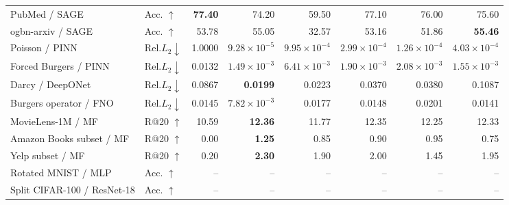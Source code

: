 \begin{table}[htbp]
{\begin{tabular}{llrrrrrr}
PubMed / SAGE  &  Acc. $\uparrow$  &  \textbf{77.40}  &  74.20  &  59.50  &  77.10  &  \cellcolor{oursbg}76.00 &  75.60 \\
ogbn-arxiv / SAGE  &  Acc. $\uparrow$  &  53.78  &  55.05  &  32.57  &  53.16  &  \cellcolor{oursbg}51.86 &  \textbf{55.46} \\
Poisson / PINN  &  Rel.$L_2\downarrow$  &  1.0000  &  {\boldmath $9.28\!\times\!10^{-5}$}  &  $9.95\!\times\!10^{-4}$  &  $2.99\!\times\!10^{-4}$  &  \cellcolor{oursbg}$1.26\!\times\!10^{-4}$ &  $4.03\!\times\!10^{-4}$ \\
Forced Burgers / PINN  &  Rel.$L_2\downarrow$  &  0.0132  &  {\boldmath $1.49\!\times\!10^{-3}$}  &  $6.41\!\times\!10^{-3}$  &  $1.90\!\times\!10^{-3}$  &  \cellcolor{oursbg}$2.08\!\times\!10^{-3}$ &  $1.55\!\times\!10^{-3}$ \\
Darcy / DeepONet  &  Rel.$L_2\downarrow$  &  0.0867  &  \textbf{0.0199}  &  0.0223  &  0.0370  &  \cellcolor{oursbg}0.0380 &  0.1087 \\
Burgers operator / FNO  &  Rel.$L_2\downarrow$  &  0.0145  &  {\boldmath $7.82\!\times\!10^{-3}$}  &  0.0177  &  0.0148  &  \cellcolor{oursbg}0.0201 &  0.0141 \\
MovieLens-1M / MF  &  R@20 $\uparrow$  &  10.59  &  \textbf{12.36}  &  11.77  &  12.35  &  \cellcolor{oursbg}12.25 &  12.33 \\
Amazon Books subset / MF  &  R@20 $\uparrow$  &  0.00  &  \textbf{1.25}  &  0.85  &  0.90  &  \cellcolor{oursbg}0.95 &  0.75 \\
Yelp subset / MF  &  R@20 $\uparrow$  &  0.20  &  \textbf{2.30}  &  1.90  &  2.00  &  \cellcolor{oursbg}1.45 &  1.95 \\
Rotated MNIST / MLP  &  Acc. $\uparrow$  &  --  &  --  &  --  &  --  &  \cellcolor{oursbg}-- &  -- \\
Split CIFAR-100 / ResNet-18  &  Acc. $\uparrow$  &  --  &  --  &  --  &  --  &  \cellcolor{oursbg}-- &  -- \\
\bottomrule
\end{tabular}}
\end{table}
